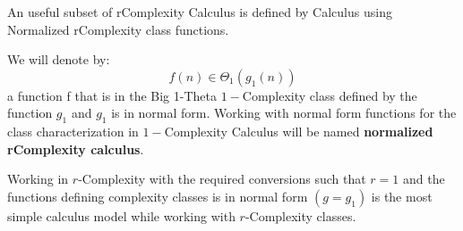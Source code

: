 An useful subset of rComplexity Calculus is defined by Calculus using Normalized rComplexity class functions.
\begin{definition}
We will denote by: 
\[ f(n) \in \Theta_{1}(g_{1}(n)) \]
a function f that is in the Big 1-Theta $1-$Complexity class defined by the function $g_{1}$ and $g_{1}$ is in normal form. Working with normal form functions for the class characterization in $1-$Complexity Calculus will be named \textbf{normalized rComplexity calculus}.
\end{definition}

\begin{remark}
Working in $r$-Complexity with the required conversions such that $r = 1$ and the functions defining complexity classes is in normal form $(g = g_{1})$ is the most simple
calculus model while working with $r$-Complexity classes.
\end{remark}